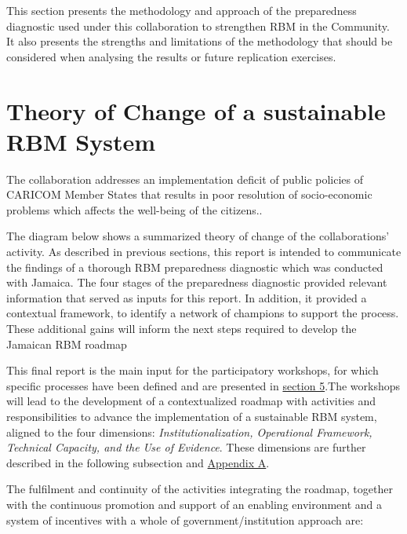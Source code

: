 \documentclass[
  10pt,
]{book}
\begin{document}
This section presents the methodology and approach of the preparedness diagnostic used under this collaboration to strengthen RBM in the Community. It also presents the strengths and limitations of the methodology that should be considered when analysing the results or future replication exercises.

\hypertarget{theory-of-change-of-a-sustainable-rbm-system}{%
\section{Theory of Change of a sustainable RBM System}\label{theory-of-change-of-a-sustainable-rbm-system}}

The collaboration addresses an implementation deficit of public policies of CARICOM Member States that results in poor resolution of socio-economic problems which affects the well-being of the citizens..

The diagram below shows a summarized theory of change of the collaborations' activity. As described in previous sections, this report is intended to communicate the findings of a thorough RBM preparedness diagnostic which was conducted with Jamaica. The four stages of the preparedness diagnostic provided relevant information that served as inputs for this report. In addition, it provided a contextual framework, to identify a network of champions to support the process. These additional gains will inform the next steps required to develop the Jamaican RBM roadmap

This final report is the main input for the participatory workshops, for which specific processes have been defined and are presented in \protect\hyperlink{section5}{section 5}.The workshops will lead to the development of a contextualized roadmap with activities and responsibilities to advance the implementation of a sustainable RBM system, aligned to the four dimensions: \emph{Institutionalization, Operational Framework, Technical Capacity, and the Use of Evidence}. These dimensions are further described in the following subsection and \protect\hyperlink{appendixA}{Appendix A}.

The fulfilment and continuity of the activities integrating the roadmap, together with the continuous promotion and support of an enabling environment and a system of incentives with a whole of government/institution approach are:
\end{document}
